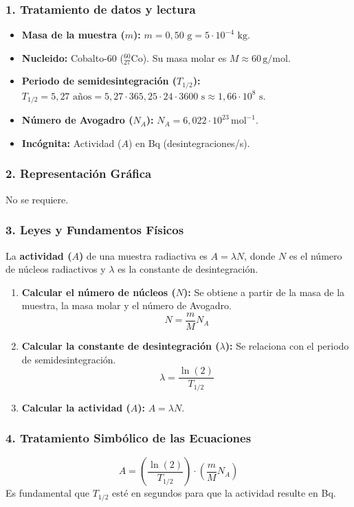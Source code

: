 \subsubsection*{1. Tratamiento de datos y lectura}
\begin{itemize}
    \item \textbf{Masa de la muestra ($m$):} $m = 0,50 \text{ g} = 5 \cdot 10^{-4} \text{ kg}$.
    \item \textbf{Nucleido:} Cobalto-60 (${}^{60}_{27}\text{Co}$). Su masa molar es $M \approx 60 \, \text{g/mol}$.
    \item \textbf{Periodo de semidesintegración ($T_{1/2}$):} $T_{1/2} = 5,27 \text{ años} = 5,27 \cdot 365,25 \cdot 24 \cdot 3600 \text{ s} \approx 1,66 \cdot 10^8 \text{ s}$.
    \item \textbf{Número de Avogadro ($N_A$):} $N_A = 6,022 \cdot 10^{23} \, \text{mol}^{-1}$.
    \item \textbf{Incógnita:} Actividad ($A$) en Bq (desintegraciones/s).
\end{itemize}

\subsubsection*{2. Representación Gráfica}
No se requiere.

\subsubsection*{3. Leyes y Fundamentos Físicos}
La \textbf{actividad ($A$)} de una muestra radiactiva es $A = \lambda N$, donde $N$ es el número de núcleos radiactivos y $\lambda$ es la constante de desintegración.
\begin{enumerate}
    \item \textbf{Calcular el número de núcleos ($N$):} Se obtiene a partir de la masa de la muestra, la masa molar y el número de Avogadro.
    $$N = \frac{m}{M} N_A$$
    \item \textbf{Calcular la constante de desintegración ($\lambda$):} Se relaciona con el periodo de semidesintegración.
    $$\lambda = \frac{\ln(2)}{T_{1/2}}$$
    \item \textbf{Calcular la actividad ($A$):} $A = \lambda N$.
\end{enumerate}

\subsubsection*{4. Tratamiento Simbólico de las Ecuaciones}
$$A = \left( \frac{\ln(2)}{T_{1/2}} \right) \cdot \left( \frac{m}{M} N_A \right)$$
Es fundamental que $T_{1/2}$ esté en segundos para que la actividad resulte en Bq.

